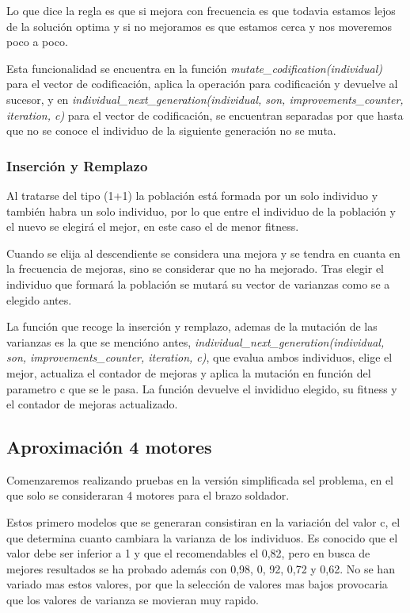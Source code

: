 \documentclass[12pt, spanish, pdftex]{UC3M_document}
\begin{document}
Lo que dice la regla es que si mejora con frecuencia es que todavia estamos lejos de la solución optima y si no mejoramos es que estamos cerca y nos moveremos poco a poco.

Esta funcionalidad se encuentra en la función \textit{mutate\_codification(individual)} para el vector de codificación, aplica la operación para codificación y devuelve al sucesor, y en \textit{individual\_next\_generation(individual, son, improvements\_counter, iteration, c)} para el vector de codificación, se encuentran separadas por que hasta que no se conoce el individuo de la siguiente generación no se muta.

\subsubsection{Inserción y Remplazo}
Al tratarse del tipo (1+1) la población está formada por un solo individuo y también habra un solo individuo, por lo que entre el individuo de la población y el nuevo se elegirá el mejor, en este caso el de menor fitness.

Cuando se elija al descendiente se considera una mejora y se tendra en cuanta en la frecuencia de mejoras, sino se considerar que no ha mejorado. Tras elegir el individuo que formará la población se mutará su vector de varianzas como se a elegido antes.

La función que recoge la inserción y remplazo, ademas de la mutación de las varianzas es la que se mencióno antes, \textit{individual\_next\_generation(individual, son, improvements\_counter, iteration, c)}, que evalua ambos individuos, elige el mejor, actualiza el contador de mejoras y aplica la mutación en función del parametro c que se le pasa. La función devuelve el invididuo elegido, su fitness y el contador de mejoras actualizado. 

\subsection{Aproximación 4 motores}
Comenzaremos realizando pruebas en la versión simplificada sel problema, en el que solo se consideraran 4 motores para el brazo soldador. 

Estos primero modelos que se generaran consistiran en la variación del valor c, el que determina cuanto cambiara la varianza de los individuos. Es conocido que el valor debe ser inferior a 1 y que el recomendables el 0,82, pero en busca de mejores resultados se ha probado además con 0,98, 0, 92, 0,72 y 0,62. No se han variado mas estos valores, por que la selección de valores mas bajos provocaria que los valores de varianza se movieran muy rapido.
\end{document}
